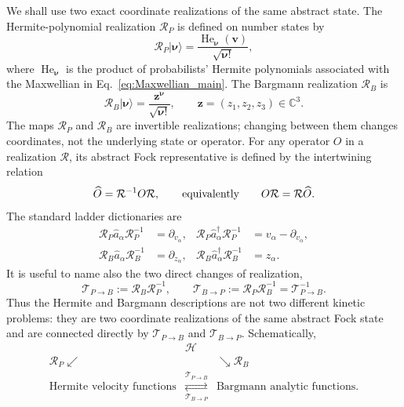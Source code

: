 \documentclass[11pt]{article}
\numberwithin{equation}{section}
\newcommand{\C}{\mathbb C}
\theoremstyle{definition}
\begin{document}
We shall use two exact coordinate realizations of the same abstract state.
The Hermite-polynomial realization $\mathcal R_P$ is defined on number states
by
\begin{equation}
 \mathcal R_P|\boldsymbol{\nu}\rangle
 =
 \frac{\operatorname{He}_{\boldsymbol{\nu}}(\bm v)}
 {\sqrt{\boldsymbol{\nu}!}},
 \label{eq:RP_dictionary}
\end{equation}
where $\operatorname{He}_{\boldsymbol{\nu}}$ is the product of probabilists'
Hermite polynomials associated with the Maxwellian in
Eq.~\eqref{eq:Maxwellian_main}.  The Bargmann realization $\mathcal R_B$ is
\begin{equation}
 \mathcal R_B|\boldsymbol{\nu}\rangle
 =
 \frac{\bm z^{\boldsymbol{\nu}}}{\sqrt{\boldsymbol{\nu}!}},
 \qquad
 \bm z=(z_1,z_2,z_3)\in\C^3.
 \label{eq:RB_dictionary}
\end{equation}
The maps $\mathcal R_P$ and $\mathcal R_B$ are invertible realizations;
changing between them changes coordinates, not the underlying state or
operator.  For any operator $O$ in a realization $\mathcal R$, its abstract
Fock representative is defined by the intertwining relation
\begin{equation}
 \widehat O=\mathcal R^{-1}O\mathcal R,
 \qquad\hbox{equivalently}\qquad
 O\mathcal R=\mathcal R\widehat O.
 \label{eq:generic_intertwining_dictionary}
\end{equation}
The standard ladder dictionaries are
\begin{align}
 \mathcal R_P\hat a_\alpha\mathcal R_P^{-1}
 &=\partial_{v_\alpha},
 &
 \mathcal R_P\hat a_\alpha^\dagger\mathcal R_P^{-1}
 &=v_\alpha-\partial_{v_\alpha},
 \label{eq:Hermite-ladders-nl}
 \\
 \mathcal R_B\hat a_\alpha\mathcal R_B^{-1}
 &=\partial_{z_\alpha},
 &
 \mathcal R_B\hat a_\alpha^\dagger\mathcal R_B^{-1}
 &=z_\alpha.
 \label{eq:Bargmann-ladders-nl}
\end{align}
It is useful to name also the two direct changes of realization,
\[
 \mathcal T_{P\to B}:=\mathcal R_B\mathcal R_P^{-1},
 \qquad
 \mathcal T_{B\to P}:=\mathcal R_P\mathcal R_B^{-1}
 =\mathcal T_{P\to B}^{-1}.
\]
Thus the Hermite and Bargmann descriptions are not two different kinetic
problems: they are two coordinate realizations of the same abstract Fock
state and are connected directly by $\mathcal T_{P\to B}$ and
$\mathcal T_{B\to P}$.  Schematically,
\begin{equation}
 \begin{array}{ccc}
 &\mathscr H&\\[-1mm]
 {\scriptstyle\mathcal R_P}\swarrow
 &&\searrow{\scriptstyle\mathcal R_B}\\[-1mm]
 \text{Hermite velocity functions}
 &
 \underset{\scriptstyle\mathcal T_{B\to P}}
 {\overset{\scriptstyle\mathcal T_{P\to B}}{\rightleftarrows}}
 &
 \text{Bargmann analytic functions}.
 \end{array}
 \label{eq:realization_diagram}
\end{equation}
\end{document}
